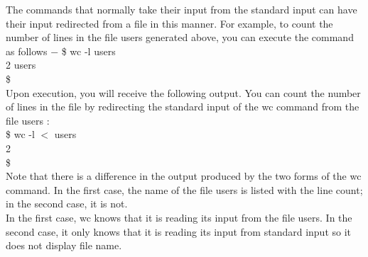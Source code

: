 \documentclass{article}
\begin{document}
The commands that normally take their input from the standard input can have their input redirected from a file in this manner. For example, to count the number of lines in the file users generated above, you can execute the command as follows −
\$ wc -l users\\
2 users\\
\$\\
Upon execution, you will receive the following output. You can count the number of lines in the file by redirecting the standard input of the wc command from the file users :\\
\$ wc -l $<$ users\\
2\\
\$\\
Note that there is a difference in the output produced by the two forms of the wc command. In the first case, the name of the file users is listed with the line count; in the second case, it is not.\\
In the first case, wc knows that it is reading its input from the file users. In the second case, it only knows that it is reading its input from standard input so it does not display file name.\\

\end{document}
